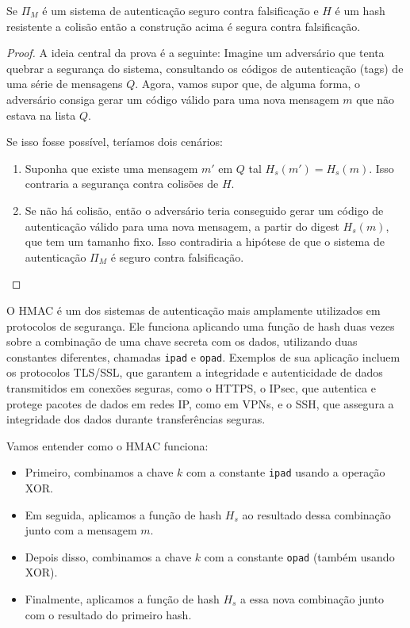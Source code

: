 \begin{theorem}
  Se $\Pi_M$ é um sistema de autenticação seguro contra falsificação e $H$ é um hash resistente a colisão então a construção acima é segura contra falsificação.
\end{theorem}
\begin{proof}
A ideia central da prova é a seguinte: 
Imagine um adversário que tenta quebrar a segurança do sistema, consultando os códigos de autenticação (tags) de uma série de mensagens $Q$.
Agora, vamos supor que, de alguma forma, o adversário consiga gerar um código válido para uma nova mensagem $m$ que não estava na lista $Q$.

Se isso fosse possível, teríamos dois cenários:
\begin{enumerate}
\item Suponha que existe uma mensagem $m'$ em $Q$ tal $H_s(m') = H_s(m)$.
  Isso contraria a segurança contra colisões de $H$.
\item Se não há colisão, então o adversário teria conseguido gerar um código de autenticação válido para uma nova mensagem, a partir do digest $H_s(m)$, que tem um tamanho fixo.
  Isso contradiria a hipótese de que o sistema de autenticação $\Pi_M$  é seguro contra falsificação.
\end{enumerate}

\end{proof}

O HMAC é um dos sistemas de autenticação mais amplamente utilizados em protocolos de segurança.
Ele funciona aplicando uma função de hash duas vezes sobre a combinação de uma chave secreta com os dados, utilizando duas constantes diferentes, chamadas {\tt ipad} e {\tt opad}.
Exemplos de sua aplicação incluem os protocolos TLS/SSL, que garantem a integridade e autenticidade de dados transmitidos em conexões seguras, como o HTTPS, o IPsec, que autentica e protege pacotes de dados em redes IP, como em VPNs, e o SSH, que assegura a integridade dos dados durante transferências seguras.

Vamos entender como o HMAC funciona:

\begin{itemize}
\item Primeiro, combinamos a chave $k$ com a constante {\tt ipad} usando a operação XOR.
\item Em seguida, aplicamos a função de hash $H_s$ ao resultado dessa combinação junto com a mensagem $m$.
\item Depois disso, combinamos a chave $k$ com a constante {\tt opad} (também usando XOR).
\item Finalmente, aplicamos a função de hash $H_s$ a essa nova combinação junto com o resultado do primeiro hash.
\end{itemize}

